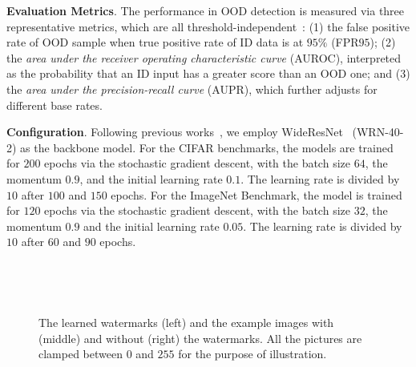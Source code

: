 \documentclass{article}
\begin{document}
\textbf{Evaluation Metrics}. The performance in OOD detection is measured via three representative metrics, which are all threshold-independent~\cite{DavisG06}: (1) the false positive rate of OOD sample when true positive rate of ID data is at $95\%$ (FPR$95$); (2) the \emph{area under the receiver operating characteristic curve} (AUROC), interpreted as the probability that an ID input has a greater score than an OOD one; and (3) the \emph{area under the precision-recall curve} (AUPR), which further adjusts for different base rates.
 
\textbf{Configuration}. Following previous works~\cite{liu2020energy}, we employ WideResNet~\cite{zagoruyko2016wide} (WRN-40-2) as the backbone model. For the CIFAR benchmarks, the models are trained for $200$ epochs via the stochastic gradient descent, with the batch size $64$, the momentum $0.9$, and the initial learning rate $0.1$. The learning rate is divided by $10$ after $100$ and $150$ epochs.  For the ImageNet Benchmark, the model is trained for $120$ epochs via the stochastic gradient descent, with the batch size $32$, the momentum $0.9$ and the initial learning rate $0.05$. The learning rate is divided by $10$ after $60$ and $90$ epochs. 

\begin{figure*}[t]
\centering  
{} 
~~~~~~~~

~~~~~~~~

\caption{The learned watermarks (left) and the example images with (middle) and without (right) the watermarks. All the pictures are clamped between $0$ and $255$ for the purpose of illustration.} \label{fig: learned watermark}

\end{figure*}
\end{document}
